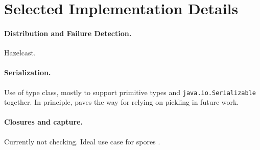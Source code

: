 \section{Selected Implementation Details}
\label{sec:serialization}

\paragraph{Distribution and Failure Detection.}
Hazelcast.

\paragraph{Serialization.}
Use of type class, mostly to support primitive types and
\lstinline{java.io.Serializable} together. In principle, paves the way for
relying on pickling \cite{MillerETAL13InstantPicklesGeneratingObjectorientedPicklerCombinators} in future work.

\paragraph{Closures and capture.} Currently not checking. Ideal use case for spores \cite{MillerHallerOdersky14SporesTypebasedFoundationClosuresAgeConcurrency}.
